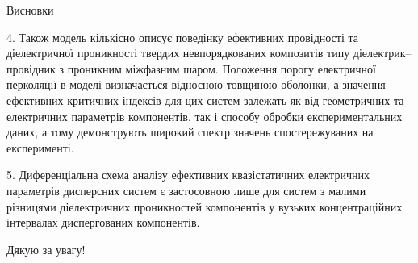 \documentclass[10pt]{beamer}
\begin{document}
\begin{frame}{Висновки}
\footnotesize

4. Також модель кількісно описує поведінку ефективних провідності та діелектричної проникності твердих невпорядкованих композитів типу діелектрик--провідник з проникним міжфазним шаром. Положення порогу електричної перколяції в моделі визначається відносною товщиною оболонки, а значення ефективних критичних індексів для цих систем залежать як від геометричних та електричних параметрів компонентів, так і способу обробки експериментальних даних, а тому демонструють широкий спектр значень спостережуваних на експерименті.

5. Диференціальна схема аналізу ефективних квазістатичних електричних параметрів дисперсних систем є застосовною лише для систем з малими різницями діелектричних проникностей компонентів у вузьких концентраційних інтервалах диспергованих компонентів.

\end{frame}


{
\begin{frame}[standout]
  Дякую за увагу!
\end{frame}
}

\appendix
\end{document}
